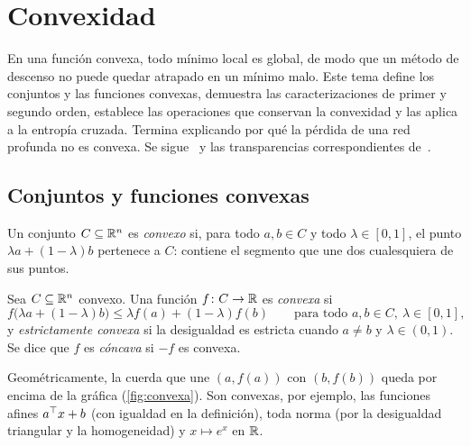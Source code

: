\chapter{Convexidad}
\label{tema:5}

En una función convexa, todo mínimo local es global, de modo que un método de descenso no puede quedar atrapado en un mínimo malo. Este tema define los conjuntos y las funciones convexas, demuestra las caracterizaciones de primer y segundo orden, establece las operaciones que conservan la convexidad y las aplica a la entropía cruzada. Termina explicando por qué la pérdida de una red profunda no es convexa. Se sigue~\cite[§3.1, §3.2 y §4.2]{bv} y las transparencias correspondientes de~\cite{ee364a}.

\section{Conjuntos y funciones convexas}

\begin{definicion}
Un conjunto $C\subseteq\mathbb{R}^{n}$ es \emph{convexo} si, para todo $a,b\in C$ y todo $\lambda\in[0,1]$, el punto $\lambda a+(1-\lambda)b$ pertenece a $C$: contiene el segmento que une dos cualesquiera de sus puntos.
\end{definicion}

\begin{definicion}\label{def:convexa}
Sea $C\subseteq\mathbb{R}^{n}$ convexo. Una función $f\colon C\to\mathbb{R}$ es \emph{convexa} si
\[
f\bigl(\lambda a+(1-\lambda)b\bigr)\le\lambda f(a)+(1-\lambda)f(b)\qquad\text{para todo } a,b\in C,\ \lambda\in[0,1],
\]
y \emph{estrictamente convexa} si la desigualdad es estricta cuando $a\ne b$ y $\lambda\in(0,1)$. Se dice que $f$ es \emph{cóncava} si $-f$ es convexa.
\end{definicion}

Geométricamente, la cuerda que une $(a,f(a))$ con $(b,f(b))$ queda por encima de la gráfica (\cref{fig:convexa}). Son convexas, por ejemplo, las funciones afines $a^{\top} x+b$ (con igualdad en la definición), toda norma (por la desigualdad triangular y la homogeneidad) y $x\mapsto e^{x}$ en $\mathbb{R}$.

